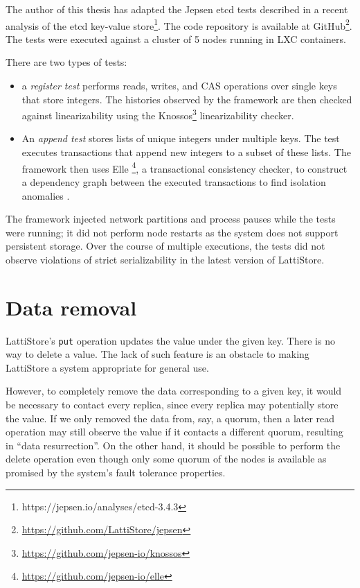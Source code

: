 \documentclass[12pt,a4paper,en]{pracamgr}
\newcommand{\ti}[1]{\textit{#1}}
\begin{document}
The author of this thesis has adapted the Jepsen etcd tests described in a recent analysis of the etcd key-value store\footnote{https://jepsen.io/analyses/etcd-3.4.3}. The code repository is available at GitHub\footnote{\url{https://github.com/LattiStore/jepsen}}. The tests were executed against a cluster of 5 nodes running in LXC containers.

There are two types of tests:
\begin{itemize}
    \item a \ti{register test} performs reads, writes, and CAS operations over single keys that store integers. The histories observed by the framework are then checked against linearizability using the Knossos\footnote{\url{https://github.com/jepsen-io/knossos}} linearizability checker.
    \item An \ti{append test} stores lists of unique integers under multiple keys. The test executes transactions that append new integers to a subset of these lists. The framework then uses Elle \cite{elle}\footnote{\url{https://github.com/jepsen-io/elle}}, a transactional consistency checker, to construct a dependency graph between the executed transactions to find isolation anomalies \cite{adya}.
\end{itemize}

The framework injected network partitions and process pauses while the tests were running; it did not perform node restarts as the system does not support persistent storage.
Over the course of multiple executions, the tests did not observe violations of strict serializability in the latest version of LattiStore.


\section{Data removal}

LattiStore's \verb#put# operation updates the value under the given key. There is no way to delete a value. The lack of such feature is an obstacle to making LattiStore a system appropriate for general use.

However, to completely remove the data corresponding to a given key, it would be necessary to contact every replica, since every replica may potentially store the value. If we only removed the data from, say, a quorum, then a later read operation may still observe the value if it contacts a different quorum, resulting in ``data resurrection''. On the other hand, it should be possible to perform the delete operation even though only some quorum of the nodes is available as promised by the system's fault tolerance properties.
\end{document}
